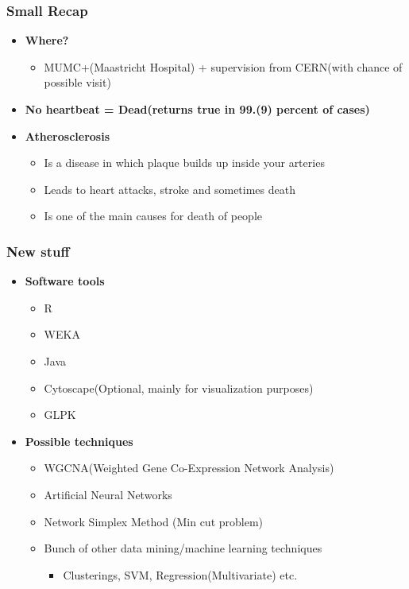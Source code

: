 \documentclass{beamer}
\begin{document}
\begin{frame}
\frametitle{Small Recap}
\begin{itemize}
	\item \textbf{Where?}
	\begin{itemize}
		\item MUMC+(Maastricht Hospital) + supervision from CERN(with chance of possible visit)
	\end{itemize}
	\item \textbf{No heartbeat = Dead(returns true in 99.(9) percent of cases)}
	\item \textbf{Atherosclerosis}
	\begin{itemize}
		\item Is a disease in which plaque builds up inside your arteries
		\item Leads to heart attacks, stroke and sometimes death
		\item Is one of the main causes for death of people
	\end{itemize}
\end{itemize}
\end{frame}

\begin{frame}
\frametitle{New stuff}
\begin{itemize}
\item \textbf{Software tools}
	\begin{itemize}
		\item R
		\item WEKA
		\item Java
		\item Cytoscape(Optional, mainly for visualization purposes)
		\item GLPK
	\end{itemize}
\item \textbf{Possible techniques}
	\begin{itemize}
		\item WGCNA(Weighted Gene Co-Expression Network Analysis)
		\item Artificial Neural Networks
		\item Network Simplex Method (Min cut problem)
		\item Bunch of other data mining/machine learning techniques
		\begin{itemize}
			\item Clusterings, SVM, Regression(Multivariate) etc.
		\end{itemize}
	\end{itemize}
\end{itemize}
\end{frame}
\end{document}
